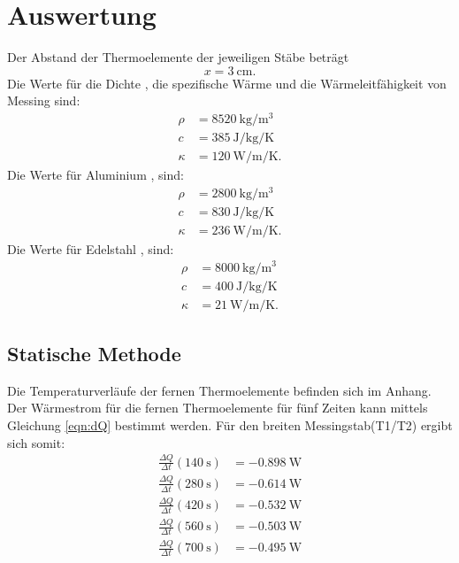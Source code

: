 \section{Auswertung}
\label{sec:Auswertung}
Der Abstand der Thermoelemente der jeweiligen Stäbe beträgt
\begin{equation*}
    x = \SI{3}{\centi\meter}.
\end{equation*}
Die Werte für die Dichte \cite{V204}, die spezifische Wärme \cite{V204} und 
die Wärmeleitfähigkeit \cite{wiki} von Messing sind: 
\begin{align*}
    \rho &= \SI{8520}{\kilo\gram\per\cubic\meter} \\
    c &= \SI{385}{\joule\per\kilo\gram\per\kelvin} \\
    \kappa &= \SI{120}{\watt\per\meter\per\kelvin}.
\end{align*}
Die Werte für Aluminium \cite{V204}, \cite{wiki} sind:
\begin{align*}
    \rho &= \SI{2800}{\kilo\gram\per\cubic\meter} \\
    c &= \SI{830}{\joule\per\kilo\gram\per\kelvin} \\
    \kappa &= \SI{236}{\watt\per\meter\per\kelvin}.
\end{align*}
Die Werte für Edelstahl \cite{V204}, \cite{edelstahl} sind:
\begin{align*}
    \rho &= \SI{8000}{\kilo\gram\per\cubic\meter} \\
    c &= \SI{400}{\joule\per\kilo\gram\per\kelvin} \\
    \kappa &= \SI{21}{\watt\per\meter\per\kelvin}.
\end{align*}

\subsection{Statische Methode}
Die Temperaturverläufe der fernen Thermoelemente
befinden sich im Anhang. %
\newline
Der Wärmestrom für die fernen Thermoelemente für fünf Zeiten kann mittels
Gleichung \ref{eqn:dQ} bestimmt werden. %
Für den breiten Messingstab(T1/T2) ergibt sich somit:
\begin{align*} %
   \frac{\Delta Q}{\Delta t}(\SI{140}{\second}) &= \SI{-0.898}{\watt} \\ 
   \frac{\Delta Q}{\Delta t}(\SI{280}{\second}) &= \SI{-0.614}{\watt} \\ 
   \frac{\Delta Q}{\Delta t}(\SI{420}{\second}) &= \SI{-0.532}{\watt} \\ 
   \frac{\Delta Q}{\Delta t}(\SI{560}{\second}) &= \SI{-0.503}{\watt} \\ 
   \frac{\Delta Q}{\Delta t}(\SI{700}{\second}) &= \SI{-0.495}{\watt} \\ 
\end{align*}

